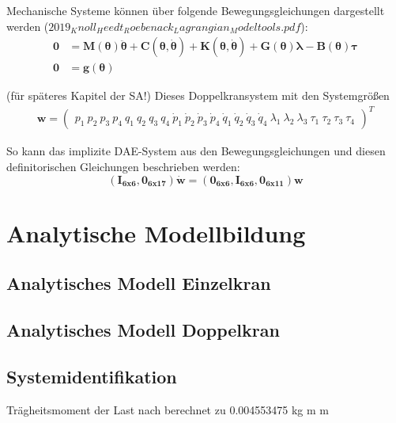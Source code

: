 Mechanische Systeme können über folgende Bewegungsgleichungen dargestellt werden ($2019_Knoll_Heedt_Roebenack_Lagrangian_Modeltools.pdf$):
\begin{align}
	\pmb{0} &= \pmb{M}(\pmb{\theta}) \pmb{\ddot{\theta}} + \pmb{C}(\pmb{\theta}, \pmb{\dot{\theta}}) + \pmb{K}(\pmb{\theta}, \pmb{\dot{\theta}}) + \pmb{G}(\pmb{\theta}) \pmb{\lambda} - \pmb{B}(\pmb{\theta}) \pmb{\tau} \\
	\pmb{0} &= \pmb{g}(\pmb{\theta}) 
\end{align}

(für späteres Kapitel der SA!)
Dieses Doppelkransystem mit den Systemgrößen
\begin{align}
	\pmb{w}
	=
	\begin{pmatrix}
		p_1 \ p_2 \ p_3 \ p_4 \ q_1 \ q_2 \ q_3 \ q_4 \ \dot{p}_1 \ \dot{p}_2 \ \dot{p}_3 \ \dot{p}_4 \ \dot{q}_1 \ \dot{q}_2 \ \dot{q}_3 \ \dot{q}_4 \ \lambda_1 \ \lambda_2 \ \lambda_3 \ \tau_1 \ \tau_2 \ \tau_3 \ \tau_4
	\end{pmatrix}^T
\end{align}

So kann das implizite DAE-System aus den Bewegungsgleichungen und diesen definitorischen Gleichungen beschrieben werden:
\begin{equation}
	(\pmb{I_{6 x 6}}, \pmb{0_{6 x 17}}) \pmb{\dot{w}} = (\pmb{0_{6 x 6}}, \pmb{I_{6 x 6}}, \pmb{0_{6 x 11}}) \pmb{w}
\end{equation}

\chapter{Analytische Modellbildung}
\section{Analytisches Modell Einzelkran}

\section{Analytisches Modell Doppelkran}

\section{Systemidentifikation}
Trägheitsmoment der Last nach %
berechnet zu 0.004553475 kg m m

